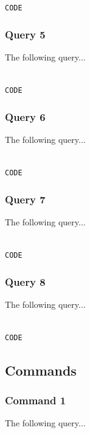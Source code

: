 \documentclass{article}
\begin{document}
\begin{lstlisting}[language=cypher, label=lst:cypher-example]

CODE

\end{lstlisting}
\subsubsection{Query 5}
The following query...

\begin{lstlisting}[language=cypher, label=lst:cypher-example]

CODE

\end{lstlisting}
\subsubsection{Query 6}
The following query...

\begin{lstlisting}[language=cypher, label=lst:cypher-example]

CODE

\end{lstlisting}
\subsubsection{Query 7}
The following query...

\begin{lstlisting}[language=cypher, label=lst:cypher-example]

CODE

\end{lstlisting}
\subsubsection{Query 8}
The following query...

\begin{lstlisting}[language=cypher, label=lst:cypher-example]

CODE

\end{lstlisting}
\newpage
\subsection{Commands}
\subsubsection{Command 1}
The following query...
\end{document}
